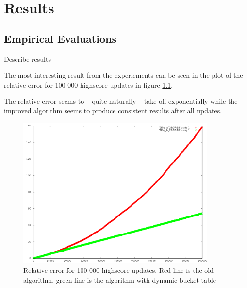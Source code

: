 \chapter{Results}

\section{Empirical Evaluations}


\begin{shaded}
  Describe results
  \end{shaded}

The most interesting result from the experiements can be seen in the plot of the relative error for 100 000 highscore updates in figure \ref{fig:relerror}.

The relative error seems to -- quite naturally -- take off exponentially while the improved algorithm seems to produce consistent results after all updates.

\begin{figure}[h!]
  \centering
  \caption{Relative error for 100 000 highscore updates. Red line is the old algorithm, green line is the algorithm with dynamic bucket-table}
  \label{fig:relerror}
  \includegraphics[width=10cm]{img/relative}
\end{figure}




